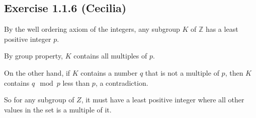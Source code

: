 \subsection*{Exercise 1.1.6 (Cecilia)}

By the well ordering axiom of the integers, any subgroup $ K $ of $ \mathbb{Z} $ has a least positive integer $ p $.

By group property, $ K $ contains all multiples of $ p $. 

On the other hand, if $ K $ contains a number $ q $ that is not a multiple of $ p $, then $ K $ contains $ q \mod p $ less than $ p $, a contradiction.

So for any subgroup of $ Z $, it must have a least positive integer where all other values in the set is a multiple of it.